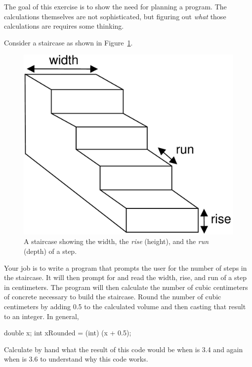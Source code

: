 \begin{exercise}
The goal of this exercise is to show the need for planning a program. The calculations themselves are not sophisticated, but figuring out {\em what} those calculations are requires some thinking.

Consider a staircase as shown in Figure~\ref{fig.staircase}.

\begin{figure}[!h]
\begin{center}
\includegraphics[scale=0.3]{figs/staircase.pdf}
\caption{A staircase showing the width, the {\em rise} (height), and the {\em run} (depth) of a step.}
\label{fig.staircase}
\end{center}
\end{figure}

Your job is to write a program that prompts the user for the number of steps in the staircase. It will then prompt for and read the width, rise, and run of a step in centimeters. The program will then calculate the number of cubic centimeters of concrete necessary to build the staircase. Round the number of cubic centimeters by adding 0.5 to the calculated volume and then casting that result to an integer.  In general,

\begin{code}
double x;
int xRounded = (int) (x + 0.5);
\end{code}

Calculate by hand what the result of this code would be when  is 3.4 and again when  is 3.6 to understand why this code works.


\end{exercise}
